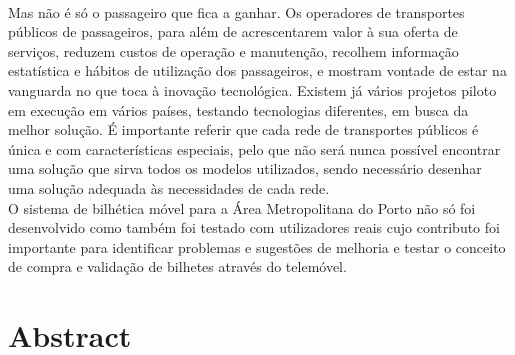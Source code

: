 \\Mas não é só o passageiro que fica a ganhar. Os operadores de transportes públicos de passageiros, para além de acrescentarem valor à sua oferta de serviços, reduzem custos de operação e manutenção, recolhem informação estatística e hábitos de utilização dos passageiros, e mostram vontade de estar na vanguarda no que toca à inovação tecnológica. Existem já vários projetos piloto em execução em vários países, testando tecnologias diferentes, em busca da melhor solução. É importante referir que cada rede de transportes públicos é única e com características especiais, pelo que não será nunca possível encontrar uma solução que sirva todos os modelos utilizados, sendo necessário desenhar uma solução adequada às necessidades de cada rede.
\\O sistema de bilhética móvel para a Área Metropolitana do Porto não só foi desenvolvido como também foi testado com utilizadores reais cujo contributo foi importante para identificar problemas e sugestões de melhoria e testar o conceito de compra e validação de bilhetes através do telemóvel.

\chapter*{Abstract}

